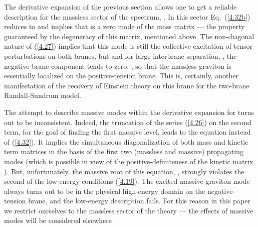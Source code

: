 \documentclass[a4paper,preprint,nofootinbib,
                 showpacs,preprintnumbers,amsmath,amssymb]{revtex4}
\begin{document}
The derivative expansion of the previous section allows one to  
get a reliable description for the  
massless sector of the spectrum, \coordHE{}. In this sector 
Eq.~(\ref{4.32b}) reduces to \coordHE{} and implies  
that \coordHE{} is a zero mode of the mass matrix \coordHE{} ---  
the property guaranteed by the degeneracy of this matrix, mentioned  
above. The non-diagonal nature of (\ref{4.27}) implies that 
this mode is still the collective excitation of tensor perturbations 
\coordHE{} on both branes, but \coordHE{} and 
for large interbrane separation, \coordHE{}, the negative brane component 
tends to zero, \coordHE{} , so that the massless graviton is 
essentially localized on the positive-tension brane. This is, certainly, 
another manifestation of the recovery of Einstein theory on this brane 
for the two-brane Randall-Sundrum model. 
 
The attempt to describe massive modes within the derivative expansion 
for \coordHE{} turns out to be inconsistent. Indeed, the truncation 
of the series (\ref{4.26}) on the second term, for the goal of finding 
the first massive level, leads to the equation 
\coordHE{} instead of (\ref{4.32}). It 
implies the simultaneous diagonalization of both mass and kinetic term 
matrices in the basis of the first two (massless and massive) propagating  
modes (which is possible in view of the positive-definiteness 
of the kinetic matrix \coordHE{}). But, unfortunately, the massive  
root of this equation,  
\coordHE{}, strongly violates  
the second of the low-energy conditions (\ref{4.19}). The excited 
massive graviton mode always turns out to be in the physical high-energy 
domain on the negative-tension brane, and the low-energy description 
fails. For this reason in this paper we restrict ourselves to the 
massless sector of the theory --- the effects of massive modes will be  
considered elsewhere \cite{rigo}.  
 
 
 
 
\end{document}
